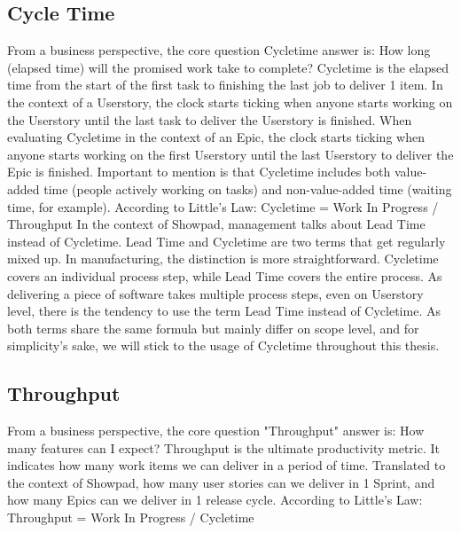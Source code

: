 \subsection{Cycle Time}
From a business perspective, the core question \gls{Cycletime} answer is: How long (elapsed time) will the promised work take to complete?
\newline
\newline
\Gls{Cycletime} is the elapsed time from the start of the first task to finishing the last job to deliver 1 item. In the context of a \gls{Userstory}, the clock starts ticking when anyone starts working on the \gls{Userstory} until the last task to deliver the \gls{Userstory} is finished. When evaluating \gls{Cycletime} in the context of an \gls{Epic}, the clock starts ticking when anyone starts working on the first \gls{Userstory} until the last \gls{Userstory} to deliver the \gls{Epic} is finished.
\newline
\newline
Important to mention is that \gls{Cycletime} includes both value-added time (people actively working on tasks) and non-value-added time (waiting time, for example).
\newline
\newline
According to Little's Law: \gls{Cycletime} = Work In Progress / Throughput
\newline
\newline
In the context of Showpad, management talks about Lead Time instead of \gls{Cycletime}. Lead Time and \gls{Cycletime} are two terms that get regularly mixed up. In manufacturing, the distinction is more straightforward. \Gls{Cycletime} covers an individual process step, while Lead Time covers the entire process. As delivering a piece of software takes multiple process steps, even on \gls{Userstory} level, there is the tendency to use the term Lead Time instead of \gls{Cycletime}. As both terms share the same formula but mainly differ on scope level, and for simplicity's sake, we will stick to the usage of \gls{Cycletime} throughout this thesis.
\subsection{Throughput}
From a business perspective, the core question "Throughput" answer is: How many features can I expect?
\newline
Throughput is the ultimate productivity metric. It indicates how many work items we can deliver in a period of time. Translated to the context of Showpad, how many user stories can we deliver in 1 \gls{Sprint}, and how many \glspl{Epic} can we deliver in 1 release cycle.
\newline
\newline
According to Little's Law: Throughput = Work In Progress / \gls{Cycletime}
\newline
